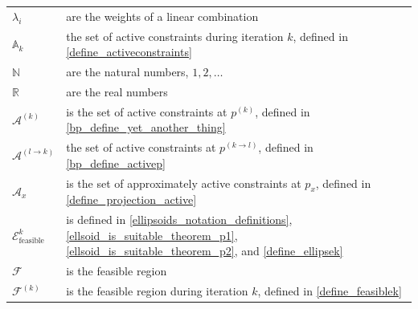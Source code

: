 \documentclass{article}
\theoremstyle{case}
\numberwithin{theorem}{subsection}
\newcommand{\activeconstraintsk}{{\mathbb A_{k}}}
\newcommand{\feasiblek}{{\mathcal F^{(k)}}}
\newcommand{\feasible}{{\mathcal F}}
\newcommand{\naturals}{\mathbb N}
\newcommand{\reals}{\mathbb R}
\newcommand{\unshiftedellipsoid}{{\mathcal E^k_{\textrm{feasible}}}}
\begin{document}
\begin{longtable}{| p{} | p{} |}
$\lambda_i$ & are the weights of a linear combination \\ %
$\activeconstraintsk$ & the set of active constraints during iteration $k$, defined in \cref{define_activeconstraints} \\ %
$\naturals $ & are the natural numbers, $1, 2, \ldots$ \\ %
$\reals $ & are the real numbers \\ %
$\mathcal A^{(k)}$ & is the set of active constraints at $p^{(k)}$, defined in \cref{bp_define_yet_another_thing} \\ %
$\mathcal A^{(l \to k)}$ & the set of active constraints at $p^{(k \to l)}$, defined in \cref{bp_define_activep} \\ %
$\mathcal A_x$ & is the set of approximately active constraints at $p_x$, defined in \cref{define_projection_active} \\ %
$\unshiftedellipsoid$ & is defined in \cref{ellipsoids_notation_definitions}, \cref{ellsoid_is_suitable_theorem_p1}, \cref{ellsoid_is_suitable_theorem_p2}, and \cref{define_ellipsek} \\ %
$\feasible$ & is the feasible region \\ %
$\feasiblek$ & is the feasible region during iteration $k$, defined in \cref{define_feasiblek} \\ %

\end{longtable}
\end{document}
